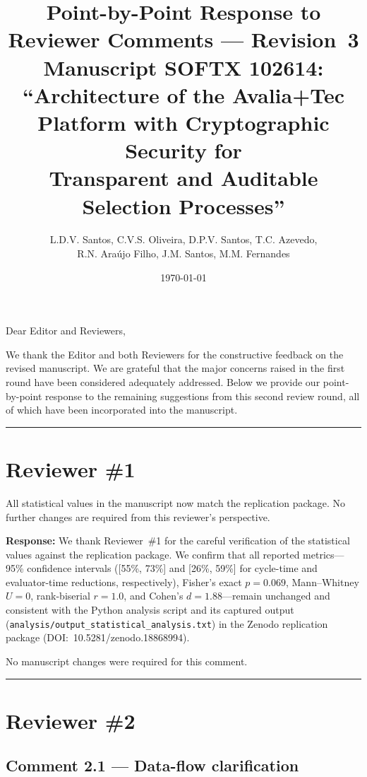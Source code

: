 \documentclass[11pt,a4paper]{article}
\title{Point-by-Point Response to Reviewer Comments --- Revision~3\\[0.3em]
\large Manuscript SOFTX 102614: ``Architecture of the Avalia+Tec Platform with Cryptographic Security for\\
Transparent and Auditable Selection Processes''}
\author{L.D.V. Santos, C.V.S. Oliveira, D.P.V. Santos, T.C. Azevedo,\\
R.N. Araújo Filho, J.M. Santos, M.M. Fernandes}
\date{\today}
\newcommand{\response}[1]{\par\noindent\textcolor{responsecolor}{\textbf{Response:}} #1}
\begin{document}
\maketitle

\noindent Dear Editor and Reviewers,

\medskip
\noindent We thank the Editor and both Reviewers for the constructive feedback on the revised manuscript. We are grateful that the major concerns raised in the first round have been considered adequately addressed. Below we provide our point-by-point response to the remaining suggestions from this second review round, all of which have been incorporated into the manuscript.

\bigskip
\hrule
\bigskip

\section*{Reviewer \#1}

\begin{reviewerbox}
All statistical values in the manuscript now match the replication package. No further changes are required from this reviewer's perspective.
\end{reviewerbox}

\response{We thank Reviewer~\#1 for the careful verification of the statistical values against the replication package. We confirm that all reported metrics---95\% confidence intervals ([55\%, 73\%] and [26\%, 59\%] for cycle-time and evaluator-time reductions, respectively), Fisher's exact $p=0.069$, Mann--Whitney $U=0$, rank-biserial $r=1.0$, and Cohen's $d=1.88$---remain unchanged and consistent with the Python analysis script and its captured output (\texttt{analysis/output\_statistical\_analysis.txt}) in the Zenodo replication package (DOI:~10.5281/zenodo.18868994).}

No manuscript changes were required for this comment.

\bigskip
\hrule
\bigskip

\section*{Reviewer \#2}

\subsection*{Comment 2.1 --- Data-flow clarification}
\end{document}
